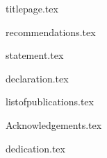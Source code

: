 \documentclass[a4paper,12pt,twoside,openany]{book}
\begin{document}
\thispagestyle{empty}

{titlepage.tex}

\normalsize

\afterpage{
  \null
  \thispagestyle{empty}
  \newpage
}

\doublespacing

{recommendations.tex}

\clearpage{\thispagestyle{empty}\cleardoublepage}

{statement.tex}

\clearpage{\thispagestyle{empty}\cleardoublepage}

{declaration.tex}

\clearpage{\thispagestyle{empty}\cleardoublepage}


{listofpublications.tex}

\clearpage{\cleardoublepage}


{Acknowledgements.tex}

\clearpage{\thispagestyle{empty}\cleardoublepage}

{dedication.tex}

\clearpage{\thispagestyle{empty}\cleardoublepage}
\end{document}
